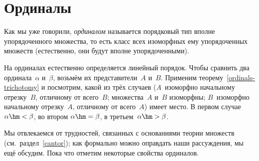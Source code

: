\section{Ординалы}
        \label{ordinals}

Как мы уже говорили, \emph{ординалом} называется порядковый тип
вполне упорядоченного множества, то есть класс всех изоморфных
ему упорядоченных множеств (естественно, они будут вполне
упорядоченными).

На ординалах естественно определяется линейный
порядок.
Чтобы сравнить два ординала~$\alpha$ и~$\beta$, возьмём их
представители~$A$ и~$B$.
Применим теорему~\ref{ordinals-trichotomy} и посмотрим, какой из
трёх случаев ($A$~изоморфно начальному
отрезку~$B$, отличному от всего~$B$; множества~$A$ и~$B$
изоморфны; $B$~изоморфно начальному отрезку~$A$, отличному от
всего~$A$) имеет место. В первом случае $\alpha\hm<\beta$,
во втором $\alpha\hm=\beta$, в
третьем~$\alpha\hm>\beta$.

Мы отвлекаемся от трудностей, связанных с основаниями теории
множеств (см.~раздел~\ref{cantor}); как формально можно
оправдать наши рассуждения, мы ещё обсудим. Пока что отметим
некоторые свойства ординалов.

